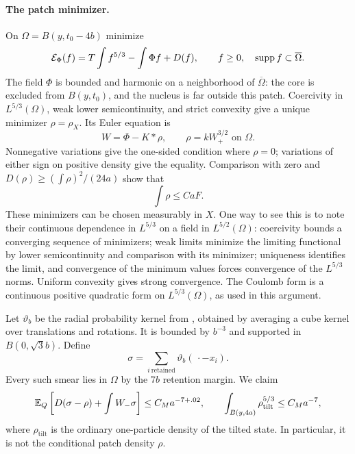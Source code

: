 \paragraph{The patch minimizer.}
On $\Omega=B(y,t_0-4b)$ minimize
\[
 \mathcal E_\Phi(f)=T\int f^{5/3}-\int\Phi f+D(f),\qquad f\geq0,
 \quad\operatorname{supp} f\subset\overline\Omega.
\]
The field $\Phi$ is bounded and harmonic on a neighborhood of
$\overline\Omega$: the core is excluded from $B(y,t_0)$, and the
nucleus is far outside this patch.  Coercivity in $L^{5/3}(\Omega)$,
weak lower semicontinuity, and strict convexity give a unique minimizer
$\rho=\rho_X$.  Its Euler equation is
\begin{equation}
 W=\Phi-K*\rho,\qquad \rho=kW_+^{3/2}\text{ on }\Omega.
 \label{eq:patch-euler}
\end{equation}
Nonnegative variations give the one-sided condition where $\rho=0$;
variations of either sign on positive density give the equality.
Comparison with zero and
$D(\rho)\geq(\int\rho)^2/(24a)$ show that
\begin{equation}
 \int\rho\leq CaF.
 \label{eq:patch-mass-bound}
\end{equation}
These minimizers can be chosen measurably in $X$.  One way to see this is
to note their continuous dependence in $L^{5/3}$ on a field in
$L^{5/2}(\Omega)$: coercivity bounds a converging sequence of minimizers;
weak limits minimize the limiting functional by lower semicontinuity and
comparison with its minimizer; uniqueness identifies the limit, and
convergence of the minimum values forces convergence of the
$L^{5/3}$ norms.  Uniform convexity gives strong convergence.  The
Coulomb form is a continuous positive quadratic form on
$L^{5/3}(\Omega)$, as used in this argument.

Let $\vartheta_b$ be the radial probability kernel from
\cite[\FNeumann]{Foundation}, obtained by averaging a cube kernel over
translations and rotations.  It is bounded by $b^{-3}$ and supported in
$B(0,\sqrt3b)$.  Define
\[
 \sigma=\sum_{i\ \mathrm{retained}}\vartheta_b(\,\cdot-x_i).
\]
Every such smear lies in $\Omega$ by the $7b$ retention margin.
We claim
\begin{equation}
 \mathbb E_Q\left[D(\sigma-\rho)+\int W_-\sigma\right]
       \leq C_Ma^{-7+.02},\qquad
 \int_{B(y,4a)}\rho_{\mathrm{tilt}}^{5/3}\leq C_Ma^{-7},
 \label{eq:patch-comparison}
\end{equation}
where $\rho_{\mathrm{tilt}}$ is the ordinary one-particle density of the
tilted state.  In particular, it is not the conditional patch density
$\rho$.

